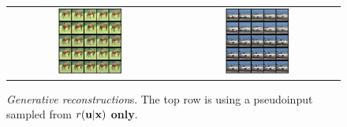 \begin{figure}[t]
\begin{center}
    \begin{tabular}{cc}
        \includegraphics[width=0.4\textwidth]{pics/5_dvp/cifar10_generative_rec_6.pdf} &
        \includegraphics[width=0.4\textwidth]{pics/5_dvp/cifar10_generative_rec_9.pdf} \\ 
    \end{tabular}
\end{center}
    \caption{\textit{Generative reconstruction}s. The top row is using a pseudoinput sampled from $r({\mathbf{u}}|{\mathbf{x}})$ \textbf{only}.}
    \label{fig:generative_recon}
    \vskip 20pt
\end{figure}
